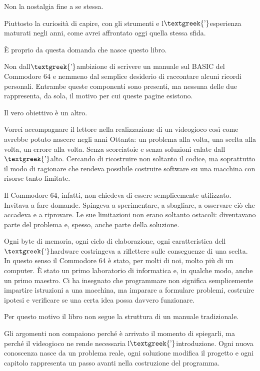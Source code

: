 \documentclass{article}
\begin{document}
Non la nostalgia fine a se stessa.

Piuttosto la curiosità di capire, con gli strumenti e l$\text{\textgreek{’}}$esperienza maturati negli anni, come avrei
affrontato oggi quella stessa sfida.

È proprio da questa domanda che nasce questo libro.

Non dall$\text{\textgreek{’}}$ambizione di scrivere un manuale sul BASIC del Commodore 64 e nemmeno dal semplice
desiderio di raccontare alcuni ricordi personali. Entrambe queste componenti sono presenti, ma nessuna delle due
rappresenta, da sola, il motivo per cui queste pagine esistono.

Il vero obiettivo è un altro.

Vorrei accompagnare il lettore nella realizzazione di un videogioco così come avrebbe potuto nascere negli anni Ottanta:
un problema alla volta, una scelta alla volta, un errore alla volta. Senza scorciatoie e senza soluzioni calate
dall$\text{\textgreek{’}}$alto. Cercando di ricostruire non soltanto il codice, ma soprattutto il modo di ragionare che
rendeva possibile costruire software su una macchina con risorse tanto limitate.

Il Commodore 64, infatti, non chiedeva di essere semplicemente utilizzato. Invitava a fare domande. Spingeva a
sperimentare, a sbagliare, a osservare ciò che accadeva e a riprovare. Le sue limitazioni non erano soltanto ostacoli:
diventavano parte del problema e, spesso, anche parte della soluzione.

Ogni byte di memoria, ogni ciclo di elaborazione, ogni caratteristica dell$\text{\textgreek{’}}$hardware costringeva a
riflettere sulle conseguenze di una scelta. In questo senso il Commodore 64 è stato, per molti di noi, molto più di un
computer. È stato un primo laboratorio di informatica e, in qualche modo, anche un primo maestro. Ci ha insegnato che
programmare non significa semplicemente impartire istruzioni a una macchina, ma imparare a formulare problemi,
costruire ipotesi e verificare se una certa idea possa davvero funzionare.

Per questo motivo il libro non segue la struttura di un manuale tradizionale.

Gli argomenti non compaiono perché è arrivato il momento di spiegarli, ma perché il videogioco ne rende necessaria
l$\text{\textgreek{’}}$introduzione. Ogni nuova conoscenza nasce da un problema reale, ogni soluzione modifica il
progetto e ogni capitolo rappresenta un passo avanti nella costruzione del programma.
\end{document}
